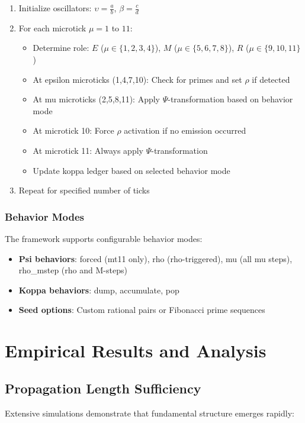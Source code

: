 \documentclass[12pt]{article}
\begin{document}
\begin{enumerate}
\item Initialize oscillators: $\upsilon = \frac{a}{b}$, $\beta = \frac{c}{d}$
\item For each microtick $\mu = 1$ to $11$:
\begin{itemize}
\item Determine role: $E$ ($\mu \in \{1,2,3,4\}$), $M$ ($\mu \in \{5,6,7,8\}$), $R$ ($\mu \in \{9,10,11\}$)
\item At epsilon microticks (1,4,7,10): Check for primes and set $\rho$ if detected
\item At mu microticks (2,5,8,11): Apply $\Psi$-transformation based on behavior mode
\item At microtick 10: Force $\rho$ activation if no emission occurred
\item At microtick 11: Always apply $\Psi$-transformation
\item Update koppa ledger based on selected behavior mode
\end{itemize}
\item Repeat for specified number of ticks
\end{enumerate}

\subsubsection{Behavior Modes}
The framework supports configurable behavior modes:

\begin{itemize}
\item \textbf{Psi behaviors}: forced (mt11 only), rho (rho-triggered), mu (all mu steps), rho\_mstep (rho and M-steps)
\item \textbf{Koppa behaviors}: dump, accumulate, pop
\item \textbf{Seed options}: Custom rational pairs or Fibonacci prime sequences
\end{itemize}

\section{Empirical Results and Analysis}

\subsection{Propagation Length Sufficiency}

Extensive simulations demonstrate that fundamental structure emerges rapidly:
\end{document}
